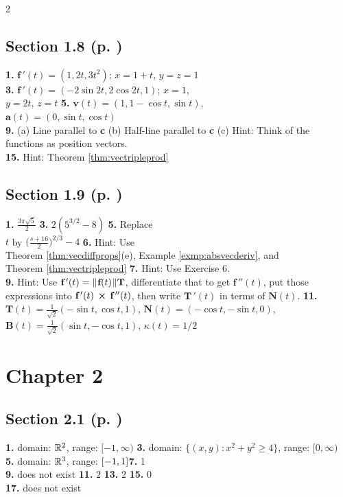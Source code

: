\begin{multicols}{2}
\subsection*{Section 1.8 (p. \pageref{sec1dot8})}
\textbf{1.} $\textbf{f}\,'(t) = (1,2t,3t^2)$; $x = 1 + t$, $y = z = 1$\\\textbf{3.} $\textbf{f}\,'(t) =
(-2\sin 2t,2\cos 2t,1)$; $x = 1$,\\$y = 2t$, $z = t$ \quad \textbf{5.} $\textbf{v}(t) = (1,1 - \cos t,\sin t)$,\\
$\textbf{a}(t) = (0,\sin t,\cos t)$\\\textbf{9.} (a) Line parallel to \textbf{c} \quad (b) Half-line parallel to
\textbf{c} \quad (c) Hint:  Think of the\\functions as position vectors.\\\textbf{15.} Hint: Theorem
\ref{thm:vectripleprod}
\subsection*{Section 1.9 (p. \pageref{sec1dot9})}
\textbf{1.} $\frac{3\pi \sqrt{5}}{2}$ \quad \textbf{3.} $2 (5^{3/2} - 8)$ \quad \textbf{5.} Replace\\$t$ by
$\biggl( \frac{s + 16}{2} \biggr)^{2/3} - 4$ \quad \textbf{6.} Hint: Use\\Theorem
\ref{thm:vecdiffprops}(e), Example \ref{exmp:absvecderiv}, and\\Theorem \ref{thm:vectripleprod} \quad \textbf{7.} Hint:
Use Exercise 6.\\\textbf{9.} Hint: Use $\textbf{f}\,'(t) = \lVert\mspace{1mu}\textbf{f}(t)\mspace{1mu}\rVert\textbf{T}$, differentiate that
to get $\textbf{f}\,''(t)$, put those expressions into $\textbf{f}\,'(t)\, \bm{\times} \,\textbf{f}\,''(t)$, then
write $\textbf{T}\,'(t)$ in terms of $\textbf{N}(t)$. \quad \textbf{11.} $\textbf{T}(t) = \frac{1}{\sqrt{2}}
(-\sin t,\cos t,1)$, $\textbf{N}(t) = (-\cos t,-\sin t,0)$, $\textbf{B}(t) = \frac{1}{\sqrt{2}}(\sin t,-\cos t,1)$,
$\kappa(t) = 1/2$
\section*{Chapter 2}
\subsection*{Section 2.1 (p. \pageref{sec2dot1})}
\textbf{1.} domain: $\mathbb{R}^{2}$, range: $\lbrack -1,\infty )$\quad
\textbf{3.} domain: $\lbrace (x,y): x^2 + y^2 \ge 4 \rbrace$, range: $\lbrack 0,\infty)$\\\textbf{5.} domain:
$\mathbb{R}^{3}$, range: $\lbrack -1,1 \rbrack$\quad\textbf{7.} 1\\\textbf{9.} does not exist\quad
\textbf{11.} $2$\quad
\textbf{13.} $2$\quad
\textbf{15.} $0$\\\textbf{17.} does not exist

\end{multicols}
